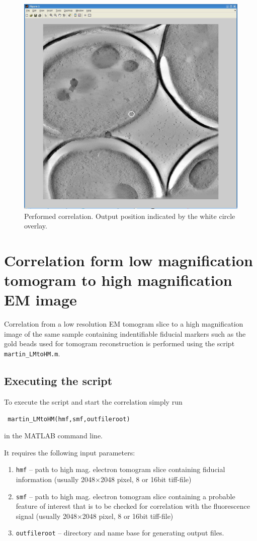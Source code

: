 \documentclass[10pt,a4paper,onepage,DIV12]{scrartcl}
\begin{document}
\begin{figure}
 \centering
 \includegraphics[width=.7\textwidth]{images/tfm_appl.jpg}
 \caption{Performed correlation. Output position indicated by the white circle overlay.}
 \label{fig:tfm_appl}
\end{figure}

 \newpage
\section{Correlation form low magnification tomogram to high magnification EM image}

Correlation from a low resolution EM tomogram slice to a high magnification image of the same sample containing indentifiable fiducial markers such as the gold beads used for tomogram reconstruction is performed using the script \texttt{martin\_LMtoHM.m}.
\subsection{Executing the script}
To execute the script and start the correlation simply run \begin{verbatim}
 martin_LMtoHM(hmf,smf,outfileroot)
\end{verbatim}
 in the MATLAB command line.


It requires the following input parameters:
\begin{enumerate}
 \item\texttt{hmf} -- path to high mag. electron tomogram slice containing fiducial information (usually 2048$\times$2048 pixel, 8 or 16bit tiff-file)
 \item\texttt{smf} -- path to high mag. electron tomogram slice containing a probable feature of interest that is to be checked for correlation with the fluorescence signal (usually 2048$\times$2048 pixel, 8 or 16bit tiff-file)
 \item\texttt{outfileroot} -- directory and name base for generating output files.
\end{enumerate}
\end{document}
